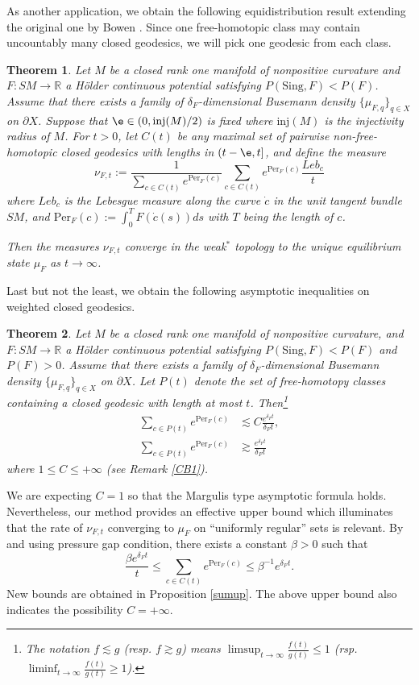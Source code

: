 \documentclass[11pt]{amsart}
\newtheorem{thmm}{Theorem}\renewcommand{\thethmm}{\Alph{thmm}}
\theoremstyle{definition}
\def\pX{{\partial X}}
\def\RR{{\mathbb R}}
\def\inj{{\text{inj}}}
\def\b{\beta}
\def\d{\delta}   %
\newcommand{\Per}{\mathrm{Per}}
\begin{document}
As another application, we obtain the following equidistribution result extending the original one by Bowen \cite{Bo33}. Since one free-homotopic class may contain uncountably many closed geodesics, we will pick one geodesic from each class.
\begin{thmm}\label{equi0}
Let $M$ be a closed rank one manifold of nonpositive curvature and $F:SM\to \RR$ a H\"{o}lder continuous potential satisfying $P(\text{Sing},F)<P(F)$. Assume that there exists a family of $\d_F$-dimensional Busemann density $\{\mu_{F,q}\}_{q\in X}$ on $\pX$. Suppose that $\e\in (0, \inj (M)/2)$ is fixed where $\inj (M)$ is the injectivity radius of $M$. For $t > 0$, let $C(t)$ be any maximal set of pairwise non-free-homotopic
closed geodesics with lengths in $(t-\e, t]$, and define the measure
$$\nu_{F,t}:=\frac{1}{\sum_{c\in C(t)}e^{\Per_F(c)}}\sum_{c\in C(t)}e^{\Per_F(c)}\frac{Leb_c}{t}$$
where $Leb_c$ is the Lebesgue measure along the curve $\dot c$ in the unit
tangent bundle $SM$, and $\Per_F(c):=\int_0^{T}F(\dot c(s))ds$ with $T$ being the length of $c$.

Then the measures $\nu_{F,t}$ converge in the
weak$^*$ topology to the unique equilibrium state $\mu_F$ as $t\to \infty$.
\end{thmm}

Last but not the least, we obtain the following asymptotic inequalities on weighted closed geodesics.
\begin{thmm}\label{margulis}
Let $M$ be a closed rank one manifold of nonpositive curvature, and $F:SM\to \RR$ a H\"{o}lder continuous potential satisfying $P(\text{Sing},F)<P(F)$ and $P(F)>0$. Assume that there exists a family of $\d_F$-dimensional Busemann density $\{\mu_{F,q}\}_{q\in X}$ on $\pX$. Let $P(t)$ denote the set of free-homotopy classes containing a closed geodesic with length at most $t$. Then\footnote{The notation $f\lesssim g$ (resp. $f\gtrsim g$) means $\limsup_{t\to \infty}\frac{f(t)}{g(t)}\le 1$ (rsp. $\liminf_{t\to \infty}\frac{f(t)}{g(t)}\ge 1$).}
\begin{equation*}
\begin{aligned}
\sum_{c\in P(t)}e^{\Per_F(c)}&\lesssim C\frac{e^{\d_Ft}}{\d_Ft},\\
\sum_{c\in P(t)}e^{\Per_F(c)}&\gtrsim \frac{e^{\d_Ft}}{\d_Ft}
\end{aligned}
\end{equation*}
where $1\le C\le +\infty$ (see Remark \ref{CB1}).
\end{thmm}
We are expecting $C=1$ so that the Margulis type asymptotic formula holds. Nevertheless, our method provides an effective upper bound which illuminates that the rate of $\nu_{F,t}$ converging to $\mu_F$ on ``uniformly regular'' sets is relevant. By \cite[Proposition 6.4]{BCFT} and using pressure gap condition, there exists a constant $\b>0$ such that 
$$\frac{\b e^{\d_Ft}}{t}\le \sum_{c\in C(t)}e^{\Per_F(c)}\le \b^{-1}e^{\d_Ft}.$$
New bounds are obtained in Proposition \ref{sumup}. The above upper bound also indicates the possibility $C=+\infty$.
\end{document}
